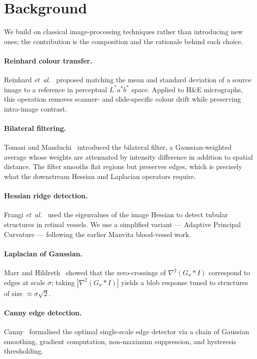 \documentclass[conference,10pt]{IEEEtran}
\begin{document}
\section{Background}
\label{sec:background}

We build on classical image-processing techniques rather than introducing new ones; the contribution is the composition and the rationale behind each choice.

\paragraph{Reinhard colour transfer.} Reinhard \emph{et~al.}~\cite{reinhard2001color} proposed matching the mean and standard deviation of a source image to a reference in perceptual $L^*a^*b^*$ space. Applied to H\&E micrographs, this operation removes scanner- and slide-specific colour drift while preserving intra-image contrast.

\paragraph{Bilateral filtering.} Tomasi and Manduchi~\cite{tomasi1998bilateral} introduced the bilateral filter, a Gaussian-weighted average whose weights are attenuated by intensity difference in addition to spatial distance. The filter smooths flat regions but preserves edges, which is precisely what the downstream Hessian and Laplacian operators require.

\paragraph{Hessian ridge detection.} Frangi \emph{et~al.}~\cite{frangi1998multiscale} used the eigenvalues of the image Hessian to detect tubular structures in retinal vessels. We use a simplified variant --- Adaptive Principal Curvature --- following the earlier Manvita blood-vessel work.

\paragraph{Laplacian of Gaussian.} Marr and Hildreth~\cite{marr1980theory} showed that the zero-crossings of $\nabla^2(G_\sigma * I)$ correspond to edges at scale $\sigma$; taking $|\nabla^2(G_\sigma * I)|$ yields a blob response tuned to structures of size $\approx \sigma\sqrt{2}$.

\paragraph{Canny edge detection.} Canny~\cite{canny1986computational} formalised the optimal single-scale edge detector via a chain of Gaussian smoothing, gradient computation, non-maximum suppression, and hysteresis thresholding.
\end{document}
